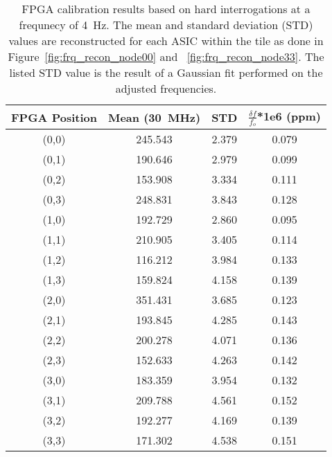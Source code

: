 \begin{table}
	\begin{center}
		\begin{tabular}{|c|c|c|c|}
			\hline
			FPGA Position & Mean (30~\unit{MHz}) & STD & $\frac{\delta f}{f_{o}}$*1e6 (ppm) \\
			\hline
			(0,0) & 245.543 & 2.379 & 0.079 \\
			\hline
			(0,1) & 190.646 & 2.979 & 0.099 \\
			\hline
			(0,2) & 153.908 & 3.334 & 0.111 \\
			\hline
			(0,3) & 248.831 & 3.843 & 0.128 \\
			\hline
			(1,0) & 192.729 & 2.860 & 0.095 \\
			\hline
			(1,1) & 210.905 & 3.405 & 0.114 \\
			\hline
			(1,2) & 116.212 & 3.984 & 0.133 \\
			\hline
			(1,3) & 159.824 & 4.158 & 0.139 \\
			\hline
			(2,0) & 351.431 & 3.685 & 0.123 \\
			\hline
			(2,1) & 193.845 & 4.285 & 0.143 \\
			\hline
			(2,2) & 200.278 & 4.071 & 0.136 \\
			\hline
			(2,3) & 152.633 & 4.263 & 0.142 \\
			\hline
			(3,0) & 183.359 & 3.954 & 0.132 \\
			\hline
			(3,1) & 209.788 & 4.561 & 0.152 \\
			\hline
			(3,2) & 192.277 & 4.169 & 0.139 \\
			\hline
			(3,3) & 171.302 & 4.538 & 0.151 \\
			\hline
		\end{tabular}
	\end{center}
	\caption{FPGA calibration results based on hard interrogations at a frequnecy of 4~\unit{Hz}.
	The mean and standard deviation (STD) values are reconstructed for each ASIC within the tile as done in Figure~\ref{fig:frq_recon_node00} and ~\ref{fig:frq_recon_node33}.
	The listed STD value is the result of a Gaussian fit performed on the adjusted frequencies.
	}
	\label{tab:fpga_calibration}
\end{table}